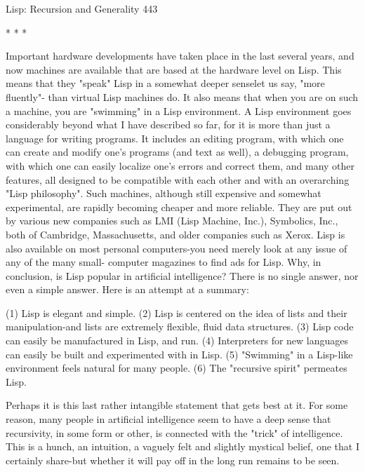 Lisp: Recursion and Generality                                                       443

                                        *   *   *

        Important hardware developments have taken place in the last several years,
and now machines are available that are based at the hardware level on Lisp. This
means that they "speak" Lisp in a somewhat deeper senselet us say, "more fluently"-
than virtual Lisp machines do. It also means that when you are on such a machine,
you are "swimming" in a Lisp environment. A Lisp environment goes considerably
beyond what I have described so far, for it is more than just a language for writing
programs. It includes an editing program, with which one can create and modify one's
programs (and text as well), a debugging program, with which one can easily localize
one's errors and correct them, and many other features, all designed to be compatible
with each other and with an overarching "Lisp philosophy".
        Such machines, although still expensive and somewhat experimental, are
rapidly becoming cheaper and more reliable. They are put out by various new
companies such as LMI (Lisp Machine, Inc.), Symbolics, Inc., both of Cambridge,
Massachusetts, and older companies such as Xerox. Lisp is also available on most
personal computers-you need merely look at any issue of any of the many small-
computer magazines to find ads for Lisp.
        Why, in conclusion, is Lisp popular in artificial intelligence? There is no
single answer, nor even a simple answer. Here is an attempt at a summary:

   (1) Lisp is elegant and simple.
   (2) Lisp is centered on the idea of lists and their manipulation-and lists are
      extremely flexible, fluid data structures.
   (3) Lisp code can easily be manufactured in Lisp, and run.
   (4) Interpreters for new languages can easily be built and experimented with in
      Lisp.
   (5) "Swimming" in a Lisp-like environment feels natural for many people.
   (6) The "recursive spirit" permeates Lisp.

       Perhaps it is this last rather intangible statement that gets best at it. For some
reason, many people in artificial intelligence seem to have a deep sense that
recursivity, in some form or other, is connected with the "trick" of intelligence. This is
a hunch, an intuition, a vaguely felt and slightly mystical belief, one that I certainly
share-but whether it will pay off in the long run remains to be seen.

